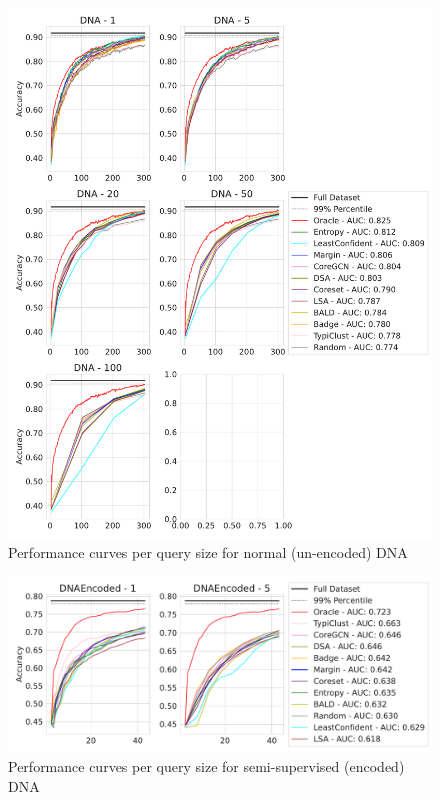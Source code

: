 \documentclass[]{article}
\begin{document}
\begin{figure}[H]
	\centering
	\caption{Performance curves per query size for normal (un-encoded) DNA}
	\includegraphics[width=\linewidth]{img/eval_dna}
\end{figure}
\begin{figure}[H]
	\centering
	\caption{Performance curves per query size for semi-supervised (encoded) DNA}
	\includegraphics[width=\linewidth]{img/eval_dna_enc} 
\end{figure}
\end{document}
